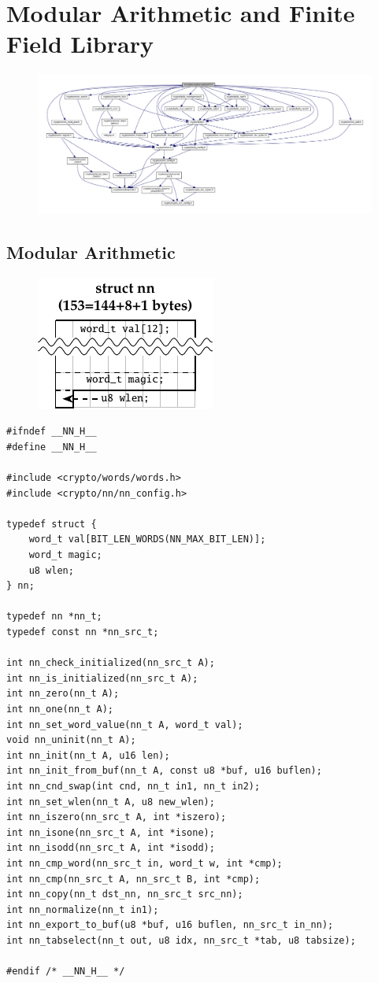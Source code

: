 \newpage
\section{Modular Arithmetic and Finite Field Library}
\begin{figure}[h!]\centering
	\includegraphics[scale=.4265, angle=-90]{dep-graph/cryptoarith.pdf}
\end{figure}
\newpage
\subsection{Modular Arithmetic}
\begin{figure}[h!]\centering
\includegraphics[scale=2.15]{struct-tikz/nn.pdf}
\end{figure}
\begin{lstlisting}[style=cstyle, caption={include/nn/nn.h}, captionpos=t]
#ifndef __NN_H__
#define __NN_H__

#include <crypto/words/words.h>
#include <crypto/nn/nn_config.h>

typedef struct {
	word_t val[BIT_LEN_WORDS(NN_MAX_BIT_LEN)];
	word_t magic;
	u8 wlen;
} nn;

typedef nn *nn_t;
typedef const nn *nn_src_t;

int nn_check_initialized(nn_src_t A);
int nn_is_initialized(nn_src_t A);
int nn_zero(nn_t A);
int nn_one(nn_t A);
int nn_set_word_value(nn_t A, word_t val);
void nn_uninit(nn_t A);
int nn_init(nn_t A, u16 len);
int nn_init_from_buf(nn_t A, const u8 *buf, u16 buflen);
int nn_cnd_swap(int cnd, nn_t in1, nn_t in2);
int nn_set_wlen(nn_t A, u8 new_wlen);
int nn_iszero(nn_src_t A, int *iszero);
int nn_isone(nn_src_t A, int *isone);
int nn_isodd(nn_src_t A, int *isodd);
int nn_cmp_word(nn_src_t in, word_t w, int *cmp);
int nn_cmp(nn_src_t A, nn_src_t B, int *cmp);
int nn_copy(nn_t dst_nn, nn_src_t src_nn);
int nn_normalize(nn_t in1);
int nn_export_to_buf(u8 *buf, u16 buflen, nn_src_t in_nn);
int nn_tabselect(nn_t out, u8 idx, nn_src_t *tab, u8 tabsize);

#endif /* __NN_H__ */
\end{lstlisting}

